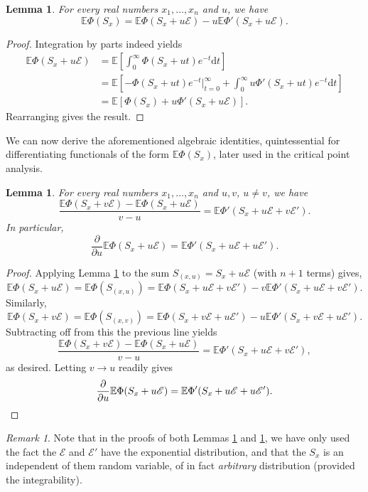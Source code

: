 \documentclass[10pt]{article}
\newcommand{\dd}{\mathrm{d}}
\newcommand{\E}{\mathbb{E}}
\newcommand{\1}{\textbf{1}}
\newcommand{\cE}{\mathscr{E}}
\newtheorem{lemma}[theorem]{Lemma}
\theoremstyle{remark}
\newtheorem{remark}[theorem]{Remark}
\theoremstyle{definition}
\begin{document}
\begin{lemma}\label{lm:by-parts}
For every real numbers $x_1, \dots, x_n$ and $u$, we have
\[ 
\E\Phi(S_x) = \E\Phi(S_x  + u\cE) - u\E\Phi'(S_x+u\cE).
 \]
\end{lemma}
\begin{proof}
Integration by parts indeed yields
\begin{align*}
\E\Phi(S_x + u\cE) &= \E\left[\int_0^\infty \Phi(S_x + ut)e^{-t} \dd t \right]\\
&= \E\left[-\Phi(S_x + ut)e^{-t}\Big|_{t=0}^\infty + \int_0^\infty u\Phi'(S_x + ut)e^{-t} \dd t\right] \\
&=\E\left[\Phi(S_x) + u\Phi'(S_x + u\cE)\right].
\end{align*}
Rearranging gives the result.
\end{proof}

We can now derive the aforementioned algebraic identities, quintessential for differentiating functionals of the form $\E \Phi(S_x)$, later used in the critical point analysis.

\begin{lemma}\label{lm:diff}
For every real numbers $x_1, \dots, x_n$ and $u, v$, $u \neq v$, we have
\[ 
\frac{\E\Phi(S_x + v\cE) - \E\Phi(S_x+u\cE)}{v-u} = \E\Phi'(S_x+u\cE + v\cE').
 \]
In particular,
\[ 
\frac{\partial}{\partial u} \E \Phi(S_x+u\cE) = \E\Phi'(S_x+u\cE + u\cE').
 \]
\end{lemma}
\begin{proof}
Applying Lemma \ref{lm:by-parts} to the sum $S_{(x, u)} = S_x + u\cE$ (with $n+1$ terms) gives,
\[ 
\E\Phi(S_x+u\cE) = \E\Phi(S_{(x,u)}) = \E\Phi(S_x + u\cE + v\cE') - v\E\Phi'(S_x + u\cE + v\cE').
 \]
Similarly,
\[ 
\E\Phi(S_x+v\cE) = \E\Phi(S_{(x,v)}) = \E\Phi(S_x + v\cE + u\cE') - u\E\Phi'(S_x + v\cE + u\cE').
 \]
Subtracting off from this the previous line yields
\[ 
\frac{\E\Phi(S_x + v\cE) - \E\Phi(S_x+u\cE)}{v-u} = \E\Phi'(S_x+u\cE + v\cE'),
 \]
as desired. Letting $v \to u$ readily gives
\[ 
\frac{\partial}{\partial u} \E \Phi(S_x+u\cE) = \E\Phi'(S_x+u\cE + u\cE').\qedhere
 \]
\end{proof}

\begin{remark}\label{rem:lm-diff-gen}
Note that in the proofs of both Lemmas \ref{lm:by-parts} and \ref{lm:diff}, we have only used the fact the $\cE$ and $\cE'$ have the exponential distribution, and that the $S_x$ is an independent of them random variable, of in fact \emph{arbitrary} distribution (provided the integrability). 
\end{remark}
\end{document}
